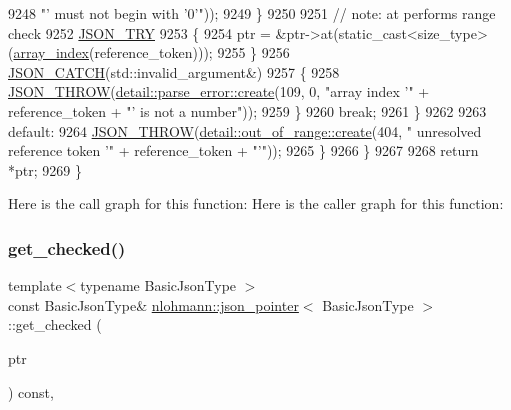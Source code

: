 \begin{DoxyCode}
9248                                                                \textcolor{stringliteral}{"' must not begin with '0'"}));
9249                     \}
9250 
9251                     \textcolor{comment}{// note: at performs range check}
9252                     \hyperlink{json_8hpp_a985d3b82445302c57257f6432f261fe9}{JSON\_TRY}
9253                     \{
9254                         ptr = &ptr->at(static\_cast<size\_type>(\hyperlink{classnlohmann_1_1json__pointer_ac53f5b79dd91da78743c437832f57ce4}{array\_index}(reference\_token)));
9255                     \}
9256                     \hyperlink{json_8hpp_a6954bec49ed2a2dfb938c1131c82740a}{JSON\_CATCH}(std::invalid\_argument&)
9257                     \{
9258                         \hyperlink{json_8hpp_a6c274f6db2e65c1b66c7d41b06ad690f}{JSON\_THROW}(\hyperlink{classnlohmann_1_1detail_1_1parse__error_a9fd60ad6bce80fd99686ad332faefd37}{detail::parse\_error::create}(109, 0,
       \textcolor{stringliteral}{"array index '"} + reference\_token + \textcolor{stringliteral}{"' is not a number"}));
9259                     \}
9260                     \textcolor{keywordflow}{break};
9261                 \}
9262 
9263                 \textcolor{keywordflow}{default}:
9264                     \hyperlink{json_8hpp_a6c274f6db2e65c1b66c7d41b06ad690f}{JSON\_THROW}(\hyperlink{classnlohmann_1_1detail_1_1out__of__range_a3f6d82a6f967c4728a1ec735a7867073}{detail::out\_of\_range::create}(404, \textcolor{stringliteral}{"
      unresolved reference token '"} + reference\_token + \textcolor{stringliteral}{"'"}));
9265             \}
9266         \}
9267 
9268         \textcolor{keywordflow}{return} *ptr;
9269     \}
\end{DoxyCode}
Here is the call graph for this function\+:
Here is the caller graph for this function\+:
\mbox{\label{classnlohmann_1_1json__pointer_a55a5bbbc3007e479607304a3e8cb9bf5}} 
\subsubsection{\texorpdfstring{get\+\_\+checked()}{get\_checked()}\hspace{0.1cm}{\footnotesize\ttfamily [2/2]}}
{\footnotesize\ttfamily template$<$typename Basic\+Json\+Type $>$ \\
const Basic\+Json\+Type\& \hyperlink{classnlohmann_1_1json__pointer}{nlohmann\+::json\+\_\+pointer}$<$ Basic\+Json\+Type $>$\+::get\+\_\+checked (\begin{DoxyParamCaption}\item[{const Basic\+Json\+Type $\ast$}]{ptr }\end{DoxyParamCaption}) const\hspace{0.3cm}{\ttfamily [inline]}, {\ttfamily [private]}}


